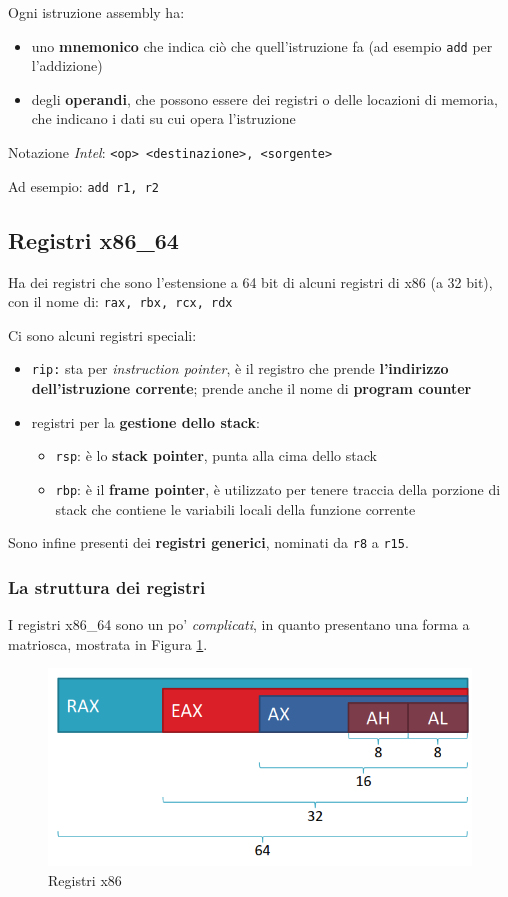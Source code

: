 Ogni istruzione assembly ha:
\begin{itemize}
    \item uno \textbf{mnemonico} che indica ciò che quell'istruzione fa (ad esempio \texttt{add} per l'addizione)
    \item degli \textbf{operandi}, che possono essere dei registri o delle locazioni di memoria, che 
    indicano i dati su cui opera l'istruzione
\end{itemize}
Notazione \textit{Intel}: \texttt{<op> <destinazione>, <sorgente>}

Ad esempio: \texttt{add r1, r2}

\subsection{Registri x86\_64}

Ha dei registri che sono l'estensione a 64 bit di alcuni 
registri di x86 (a 32 bit), con il nome di: \texttt{rax, rbx, rcx, rdx}

Ci sono alcuni registri speciali:
\begin{itemize}
    \item \texttt{rip:} sta per \textit{instruction pointer}, è il registro che prende
    \textbf{l'indirizzo dell'istruzione corrente}; prende anche il nome di \textbf{program counter}
    \item registri per la \textbf{gestione dello stack}:
    \begin{itemize}
        \item \texttt{rsp}: è lo \textbf{stack pointer}, punta alla cima dello stack
        \item \texttt{rbp}: è il \textbf{frame pointer}, è utilizzato per tenere traccia della porzione 
        di stack che contiene le variabili locali della funzione corrente 
    \end{itemize}
\end{itemize}

Sono infine presenti dei \textbf{registri generici}, nominati da \texttt{r8} a \texttt{r15}.

\subsubsection{La struttura dei registri}

I registri x86\_64 sono un po' \textit{complicati}, in quanto presentano una forma a matriosca,
mostrata in Figura \ref{fig:regx86}.

\begin{figure}[ht]
    \centering
    \includegraphics[width=0.75\linewidth]{images/registri.png}
    \caption{Registri x86}
    \label{fig:regx86}
\end{figure}

